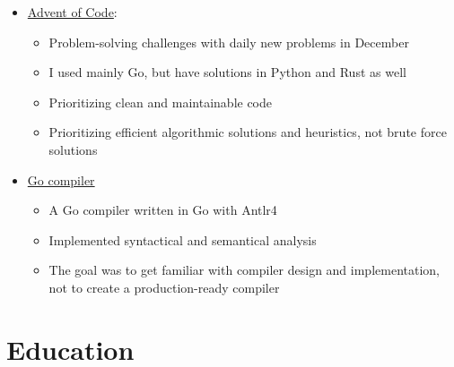 \documentclass[letterpaper]{twentysecondcv} %
\begin{document}
\begin{itemize}
	\item \href{https://github.com/taskat/aoc}{Advent of Code}:
	      \begin{itemize}[parsep=0.1em]
		      \item Problem-solving challenges with daily new problems in December
		      \item I used mainly Go, but have solutions in Python and Rust as well
		      \item Prioritizing clean and maintainable code
		      \item Prioritizing efficient algorithmic solutions and heuristics, not brute force solutions
	      \end{itemize}
	\item \href{https://github.com/taskat/gopp}{Go compiler}
	      \begin{itemize}[parsep=0.1em]
		      \item A Go compiler written in Go with Antlr4
		      \item Implemented syntactical and semantical analysis
		      \item The goal was to get familiar with compiler design and implementation, not to create a production-ready compiler
	      \end{itemize}
\end{itemize}



\section{Education}

\begin{twenty} %
\end{twenty}
\end{document}

